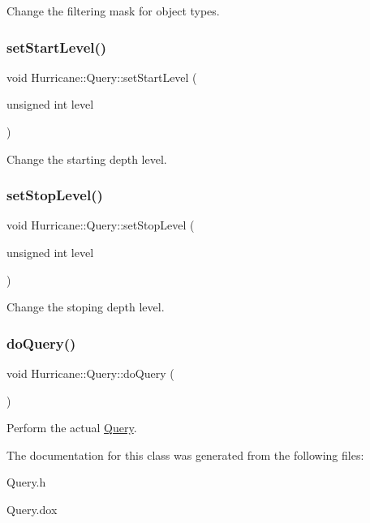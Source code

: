Change the filtering mask for object types. \mbox{\label{classHurricane_1_1Query_a8c4bc1bcfae942042ccb90a46b6fb510}} 
\subsubsection{\texorpdfstring{set\+Start\+Level()}{setStartLevel()}}
{\footnotesize\ttfamily void Hurricane\+::\+Query\+::set\+Start\+Level (\begin{DoxyParamCaption}\item[{unsigned int}]{level }\end{DoxyParamCaption})\hspace{0.3cm}{\ttfamily [inline]}}

Change the starting depth level. \mbox{\label{classHurricane_1_1Query_a70359c71d7dc7e3f17d0a29c8208c92f}} 
\subsubsection{\texorpdfstring{set\+Stop\+Level()}{setStopLevel()}}
{\footnotesize\ttfamily void Hurricane\+::\+Query\+::set\+Stop\+Level (\begin{DoxyParamCaption}\item[{unsigned int}]{level }\end{DoxyParamCaption})\hspace{0.3cm}{\ttfamily [inline]}}

Change the stoping depth level. \mbox{\label{classHurricane_1_1Query_a2ca5bf71c7b35e14c4a64488a5e21bc6}} 
\subsubsection{\texorpdfstring{do\+Query()}{doQuery()}}
{\footnotesize\ttfamily void Hurricane\+::\+Query\+::do\+Query (\begin{DoxyParamCaption}{ }\end{DoxyParamCaption})\hspace{0.3cm}{\ttfamily [virtual]}}

Perform the actual \mbox{\hyperlink{classHurricane_1_1Query}{Query}}. 

The documentation for this class was generated from the following files\+:\begin{DoxyCompactItemize}
\item 
Query.\+h\item 
Query.\+dox\end{DoxyCompactItemize}
